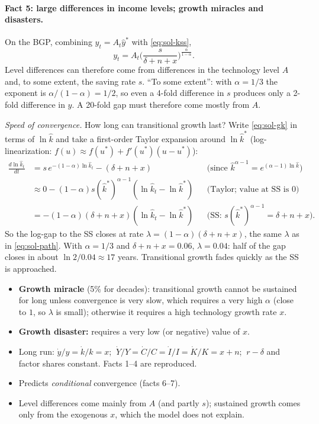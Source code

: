 \paragraph{Fact 5: large differences in income levels; growth miracles and disasters.}
On the BGP, combining $y_t=A_t\hat y^*$ with \eqref{eq:sol-kss},
\[
y_t = A_t\Big(\frac{s}{\delta+n+x}\Big)^{\frac{\alpha}{1-\alpha}} .
\]
Level differences can therefore come from differences in the technology level $A$ and, to some extent, the saving rate $s$. ``To some extent'': with $\alpha=1/3$ the exponent is $\alpha/(1-\alpha)=1/2$, so even a 4-fold difference in $s$ produces only a 2-fold difference in $y$. A 20-fold gap must therefore come mostly from $A$.

\emph{Speed of convergence.} How long can transitional growth last? Write \eqref{eq:sol-gk} in terms of $\ln\hat k$ and take a first-order Taylor expansion around $\ln\hat k^*$ (log-linearization: $f(u)\approx f(u^*)+f'(u^*)(u-u^*)$):
\begin{align*}
\frac{d\ln\hat k_t}{dt} &= s\,e^{-(1-\alpha)\ln\hat k_t}-(\delta+n+x) && \text{(since $\hat k^{\alpha-1}=e^{(\alpha-1)\ln\hat k}$)}\\
&\approx 0 - (1-\alpha)s(\hat k^*)^{\alpha-1}(\ln\hat k_t-\ln\hat k^*) && \text{(Taylor; value at SS is 0)}\\
&= -(1-\alpha)(\delta+n+x)(\ln\hat k_t-\ln\hat k^*) && \text{(SS: $s(\hat k^*)^{\alpha-1}=\delta+n+x$)}.
\end{align*}
So the log-gap to the SS closes at rate $\lambda=(1-\alpha)(\delta+n+x)$, the same $\lambda$ as in \eqref{eq:sol-path}. With $\alpha=1/3$ and $\delta+n+x=0.06$, $\lambda=0.04$: half of the gap closes in about $\ln 2/0.04\approx 17$ years. Transitional growth fades quickly as the SS is approached.

\begin{itemize}
  \item \textbf{Growth miracle} (5\% for decades): transitional growth cannot be sustained for long unless convergence is very slow, which requires a very high $\alpha$ (close to $1$, so $\lambda$ is small); otherwise it requires a high technology growth rate $x$.
  \item \textbf{Growth disaster:} requires a very low (or negative) value of $x$.
\end{itemize}

\begin{keybox}[title=Solow scorecard]
\begin{itemize}
  \item Long run: $\dot y/y=\dot k/k=x$; $\ \dot Y/Y=\dot C/C=\dot I/I=\dot K/K=x+n$; $\ r-\delta$ and factor shares constant. Facts 1--4 are reproduced.
  \item Predicts \emph{conditional} convergence (facts 6--7).
  \item Level differences come mainly from $A$ (and partly $s$); sustained growth comes only from the exogenous $x$, which the model does not explain.
\end{itemize}
\end{keybox}

